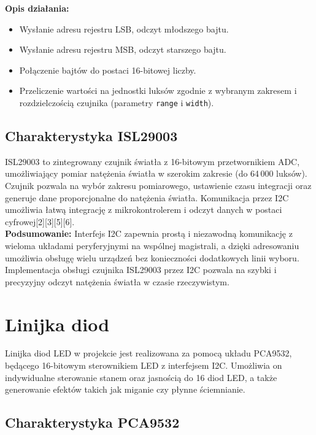 \documentclass[a4paper,12pt]{report}
\begin{document}
\textbf{Opis działania:}
\begin{itemize}
    \item Wysłanie adresu rejestru LSB, odczyt młodszego bajtu.
    \item Wysłanie adresu rejestru MSB, odczyt starszego bajtu.
    \item Połączenie bajtów do postaci 16-bitowej liczby.
    \item Przeliczenie wartości na jednostki luksów zgodnie z wybranym zakresem i rozdzielczością czujnika (parametry \texttt{range} i \texttt{width}).
\end{itemize}

\subsection*{Charakterystyka ISL29003}

ISL29003 to zintegrowany czujnik światła z 16-bitowym przetwornikiem ADC, umożliwiający pomiar natężenia światła w szerokim zakresie (do 64\,000 luksów). Czujnik pozwala na wybór zakresu pomiarowego, ustawienie czasu integracji oraz generuje dane proporcjonalne do natężenia światła. Komunikacja przez I2C umożliwia łatwą integrację z mikrokontrolerem i odczyt danych w postaci cyfrowej[2][3][5][6].\\

\textbf{Podsumowanie:}  
Interfejs I2C zapewnia prostą i niezawodną komunikację z wieloma układami peryferyjnymi na wspólnej magistrali, a dzięki adresowaniu umożliwia obsługę wielu urządzeń bez konieczności dodatkowych linii wyboru. Implementacja obsługi czujnika ISL29003 przez I2C pozwala na szybki i precyzyjny odczyt natężenia światła w czasie rzeczywistym.

\section{Linijka diod}

Linijka diod LED w projekcie jest realizowana za pomocą układu PCA9532, będącego 16-bitowym sterownikiem LED z interfejsem I2C. Umożliwia on indywidualne sterowanie stanem oraz jasnością do 16 diod LED, a także generowanie efektów takich jak miganie czy płynne ściemnianie.

\subsection*{Charakterystyka PCA9532}
\end{document}
